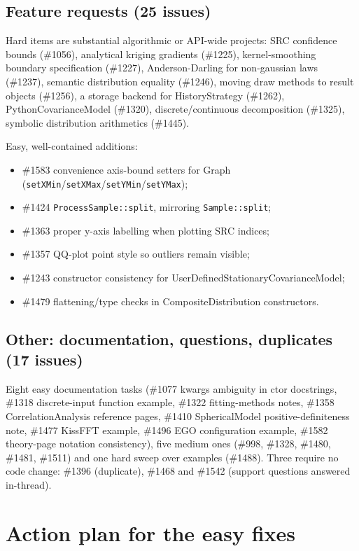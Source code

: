 \documentclass[a4paper,11pt]{article}
\begin{document}
\subsection{Feature requests (25 issues)}

Hard items are substantial algorithmic or API-wide projects: SRC confidence
bounds (\#1056), analytical kriging gradients (\#1225), kernel-smoothing
boundary specification (\#1227), Anderson-Darling for non-gaussian laws
(\#1237), semantic distribution equality (\#1246), moving draw methods to
result objects (\#1256), a storage backend for HistoryStrategy (\#1262),
PythonCovarianceModel (\#1320), discrete/continuous decomposition (\#1325),
symbolic distribution arithmetics (\#1445).

Easy, well-contained additions:
\begin{itemize}[noitemsep]
  \item \#1583 convenience axis-bound setters for Graph
        (\texttt{setXMin}/\texttt{setXMax}/\texttt{setYMin}/\texttt{setYMax});
  \item \#1424 \texttt{ProcessSample::split}, mirroring \texttt{Sample::split};
  \item \#1363 proper y-axis labelling when plotting SRC indices;
  \item \#1357 QQ-plot point style so outliers remain visible;
  \item \#1243 constructor consistency for
        UserDefinedStationaryCovarianceModel;
  \item \#1479 flattening/type checks in CompositeDistribution constructors.
\end{itemize}

\subsection{Other: documentation, questions, duplicates (17 issues)}

Eight easy documentation tasks (\#1077 kwargs ambiguity in ctor docstrings,
\#1318 discrete-input function example, \#1322 fitting-methods notes,
\#1358 CorrelationAnalysis reference pages, \#1410 SphericalModel
positive-definiteness note, \#1477 KissFFT example, \#1496 EGO configuration
example, \#1582 theory-page notation consistency), five medium ones (\#998,
\#1328, \#1480, \#1481, \#1511) and one hard sweep over examples (\#1488).
Three require no code change: \#1396 (duplicate), \#1468 and \#1542
(support questions answered in-thread).

\section{Action plan for the easy fixes}
\end{document}

